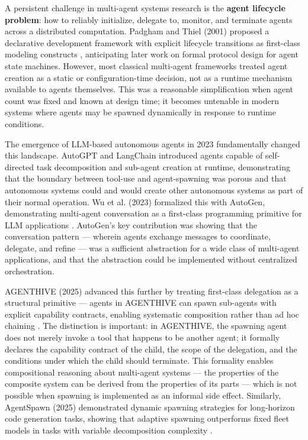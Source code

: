 A persistent challenge in multi-agent systems research is the \textbf{agent lifecycle problem}: how to reliably initialize, delegate to, monitor, and terminate agents across a distributed computation. Padgham and Thiel (2001) proposed a declarative development framework with explicit lifecycle transitions as first-class modeling constructs \cite{padgham2001}, anticipating later work on formal protocol design for agent state machines. However, most classical multi-agent frameworks treated agent creation as a static or configuration-time decision, not as a runtime mechanism available to agents themselves. This was a reasonable simplification when agent count was fixed and known at design time; it becomes untenable in modern systems where agents may be spawned dynamically in response to runtime conditions.

The emergence of LLM-based autonomous agents in 2023 fundamentally changed this landscape. AutoGPT \cite{autoGPT2023} and LangChain \cite{langchain2023} introduced agents capable of self-directed task decomposition and sub-agent creation at runtime, demonstrating that the boundary between tool-use and agent-spawning was porous and that autonomous systems could and would create other autonomous systems as part of their normal operation. Wu et al. (2023) formalized this with AutoGen, demonstrating multi-agent conversation as a first-class programming primitive for LLM applications \cite{autogen2023}. AutoGen's key contribution was showing that the conversation pattern — wherein agents exchange messages to coordinate, delegate, and refine — was a sufficient abstraction for a wide class of multi-agent applications, and that the abstraction could be implemented without centralized orchestration.

AGENTHIVE (2025) advanced this further by treating first-class delegation as a structural primitive — agents in AGENTHIVE can spawn sub-agents with explicit capability contracts, enabling systematic composition rather than ad hoc chaining \cite{agenthive2025}. The distinction is important: in AGENTHIVE, the spawning agent does not merely invoke a tool that happens to be another agent; it formally declares the capability contract of the child, the scope of the delegation, and the conditions under which the child should terminate. This formality enables compositional reasoning about multi-agent systems — the properties of the composite system can be derived from the properties of its parts — which is not possible when spawning is implemented as an informal side effect. Similarly, AgentSpawn (2025) demonstrated dynamic spawning strategies for long-horizon code generation tasks, showing that adaptive spawning outperforms fixed fleet models in tasks with variable decomposition complexity \cite{agentspawn2025}.

